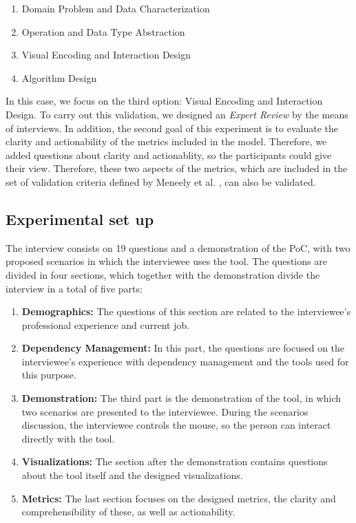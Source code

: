 \begin{enumerate}
  \item Domain Problem and Data Characterization
  \item Operation and Data Type Abstraction
  \item Visual Encoding and Interaction Design
  \item Algorithm Design
\end{enumerate}

In this case, we focus on the third option: Visual Encoding and Interaction Design. To carry out this validation, we designed an \textit{Expert Review} by the means of interviews. In addition, the second goal of this experiment is to evaluate the clarity and actionability of the metrics included in the model. Therefore, we added questions about clarity and actionablity, so the participants could give their view. Therefore, these two aspects of the metrics, which are included in the set of validation criteria defined by Meneely et al. \cite{Meneely2012}, can also be validated.

\subsection{Experimental set up}
The interview consists on 19 questions and a demonstration of the PoC, with two proposed scenarios in which the interviewee uses the tool. The questions are divided in four sections, which together with the demonstration divide the interview in a total of five parts:

\begin{enumerate}
  \item \textbf{Demographics:} The questions of this section are related to the interviewee's professional experience and current job.
  \item \textbf{Dependency Management:} In this part, the questions are focused on the interviewee's experience with dependency management and the tools used for this purpose.
  \item \textbf{Demonstration:} The third part is the demonstration of the tool, in which two scenarios are presented to the interviewee. During the scenarios discussion, the interviewee controls the mouse, so the person can interact directly with the tool.
  \item \textbf{Visualizations:} The section after the demonstration contains questions about the tool itself and the designed visualizations.
  \item \textbf{Metrics:} The last section focuses on the designed metrics, the clarity and comprehensibility of these, as well as actionability.
\end{enumerate}

